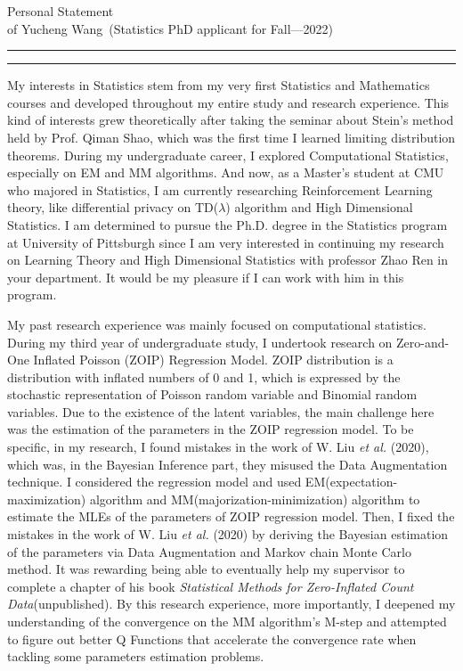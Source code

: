 \documentclass{article}
\newcommand{\soptitle}{Personal Statement}
\newcommand{\yourname}{Yucheng Wang}
\begin{document}
\begin{center}\LARGE\soptitle\\
\large of \yourname\ (Statistics PhD applicant for Fall---2022)
\end{center}

\hrule
\vspace{1pt}
\hrule height 1pt

\bigskip

My interests in Statistics stem from my very first Statistics and Mathematics courses and developed throughout my entire study and research experience. This kind of interests grew theoretically after taking the seminar about Stein's method held by Prof. Qiman Shao, which was the first time I learned limiting distribution theorems. During my undergraduate career, I explored Computational Statistics, especially on EM and MM algorithms. And now, as a Master's student at CMU who majored in Statistics, I am currently researching Reinforcement Learning theory, like differential privacy on TD($\lambda$) algorithm and High Dimensional Statistics. I am determined to pursue the Ph.D. degree in the Statistics program at University of Pittsburgh since I am very interested in continuing my research on Learning Theory and High Dimensional Statistics with professor Zhao Ren in your department. It would be my pleasure if I can work with him in this program. 

My past research experience was mainly focused on computational statistics. During my third year of undergraduate study, I undertook research on Zero-and-One Inflated Poisson (ZOIP) Regression Model. ZOIP distribution is a distribution with inflated numbers of 0 and 1, which is expressed by the stochastic representation of Poisson random variable and Binomial random variables. Due to the existence of the latent variables, the main challenge here was the estimation of the parameters in the ZOIP regression model. To be specific, in my research, I found mistakes in the work of W. Liu \textit{et al.} (2020), which was, in the Bayesian Inference part, they misused the Data Augmentation technique. I considered the regression model and used EM(expectation-maximization) algorithm and MM(majorization-minimization) algorithm to estimate the MLEs of the parameters of ZOIP regression model. Then, I fixed the mistakes in the work of W. Liu \textit{et al.} (2020) by deriving the Bayesian estimation of the parameters via Data Augmentation and Markov chain Monte Carlo method. It was rewarding being able to eventually help my supervisor to complete a chapter of his book \textit{Statistical Methods for Zero-Inflated Count Data}(unpublished). By this research experience, more importantly, I deepened my understanding of the convergence on the MM algorithm’s M-step and attempted to figure out better Q Functions that accelerate the convergence rate when tackling some parameters estimation problems.
\end{document}
